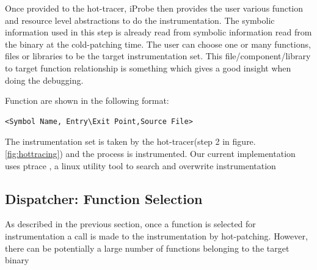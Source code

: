 Once provided to the hot-tracer, iProbe then provides the user various function and resource level abstractions to do the instrumentation. The symbolic information used in this step is already read from symbolic information read from the binary at the cold-patching time. The user can choose one or many functions, files or libraries to be the target instrumentation set. This file/component/library to target function relationship is something which gives a good insight when doing the debugging. 

Function are shown in the following format:
\begin{verbatim}
<Symbol Name, Entry\Exit Point,Source File>
\end{verbatim}

The instrumentation set is taken by the hot-tracer(step 2 in figure.\ref{fig:hottracing}) and the process is instrumented. Our current implementation uses ptrace \cite{ptrace}, a linux utility tool to search and overwrite instrumentation 

\subsection{Dispatcher: Function Selection}

As described in the previous section, once a function is selected for instrumentation a call is made to the instrumentation by hot-patching. However, there can be potentially a large number of functions belonging to the target binary 